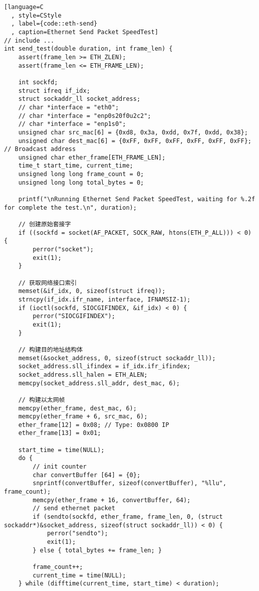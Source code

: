 \begin{lstlisting}[language=C
  , style=CStyle
  , label={code::eth-send}
  , caption=Ethernet Send Packet SpeedTest]
// include ...
int send_test(double duration, int frame_len) {
    assert(frame_len >= ETH_ZLEN);
    assert(frame_len <= ETH_FRAME_LEN);

    int sockfd;
    struct ifreq if_idx;
    struct sockaddr_ll socket_address;
    // char *interface = "eth0";
    // char *interface = "enp0s20f0u2c2";
    // char *interface = "enp1s0";
    unsigned char src_mac[6] = {0xd8, 0x3a, 0xdd, 0x7f, 0xdd, 0x38};
    unsigned char dest_mac[6] = {0xFF, 0xFF, 0xFF, 0xFF, 0xFF, 0xFF}; // Broadcast address
    unsigned char ether_frame[ETH_FRAME_LEN];
    time_t start_time, current_time;
    unsigned long long frame_count = 0;
    unsigned long long total_bytes = 0;

    printf("\nRunning Ethernet Send Packet SpeedTest, waiting for %.2f for complete the test.\n", duration);

    // 创建原始套接字
    if ((sockfd = socket(AF_PACKET, SOCK_RAW, htons(ETH_P_ALL))) < 0) {
        perror("socket");
        exit(1);
    }

    // 获取网络接口索引
    memset(&if_idx, 0, sizeof(struct ifreq));
    strncpy(if_idx.ifr_name, interface, IFNAMSIZ-1);
    if (ioctl(sockfd, SIOCGIFINDEX, &if_idx) < 0) {
        perror("SIOCGIFINDEX");
        exit(1);
    }

    // 构建目的地址结构体
    memset(&socket_address, 0, sizeof(struct sockaddr_ll));
    socket_address.sll_ifindex = if_idx.ifr_ifindex;
    socket_address.sll_halen = ETH_ALEN;
    memcpy(socket_address.sll_addr, dest_mac, 6);

    // 构建以太网帧
    memcpy(ether_frame, dest_mac, 6);
    memcpy(ether_frame + 6, src_mac, 6);
    ether_frame[12] = 0x08; // Type: 0x0800 IP
    ether_frame[13] = 0x01;

    start_time = time(NULL);
    do {
        // init counter 
        char convertBuffer [64] = {0};
        snprintf(convertBuffer, sizeof(convertBuffer), "%llu", frame_count);
        memcpy(ether_frame + 16, convertBuffer, 64);
        // send ethernet packet
        if (sendto(sockfd, ether_frame, frame_len, 0, (struct sockaddr*)&socket_address, sizeof(struct sockaddr_ll)) < 0) {
            perror("sendto");
            exit(1);
        } else { total_bytes += frame_len; }

        frame_count++;
        current_time = time(NULL);
    } while (difftime(current_time, start_time) < duration);


\end{lstlisting}
